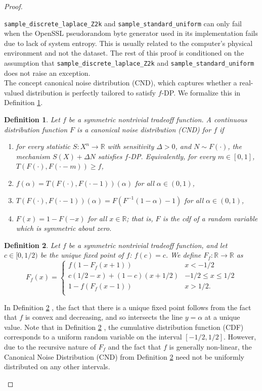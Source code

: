 \documentclass{article}
\newtheorem{defn}{Definition}
\begin{document}
\begin{proof}
\begin{enumerate}
    \texttt{sample\_discrete\_laplace\_Z2k} and \texttt{sample\_standard\_uniform} can only fail when the OpenSSL pseudorandom byte generator used in its implementation fails due to lack of system entropy. 
    This is usually related to the computer's physical environment and not the dataset. 
    The rest of this proof is conditioned on the assumption that \texttt{sample\_discrete\_laplace\_Z2k} and \texttt{sample\_standard\_uniform} does not raise an exception. \\
    The concept canonical noise distribution (CND)\parencite{awan2023canonical}, which captures whether a real-valued distribution is perfectly tailored to satisfy $f$-DP\parencite{dong2019gaussian}. We formalize this in Definition \ref{def2}\parencite{awan2023canonical}. 
    \begin{defn}\label{def2}  %
    Let $f$ be a symmetric nontrivial tradeoff function. A {continuous} distribution function $F$ is a \emph{canonical noise distribution} (CND) for $f$ if 
    \begin{enumerate}[(1)]
    \item for every statistic $S: X^n\rightarrow \mathbb{R}$ with sensitivity $\Delta>0$, and $N\sim F(\cdot)$, the mechanism $S(X) + \Delta N$ satisfies $f$-DP. Equivalently, for every $m\in [0,1]$, $T(F(\cdot),F(\cdot-m))\geq f$,
    \item $f(\alpha)=T(F(\cdot),F(\cdot-1))(\alpha)$ for all $\alpha \in (0,1)$,
    \item $T(F(\cdot),F(\cdot-1))(\alpha) = F(F^{-1}(1-\alpha)-1)$ for all $\alpha \in (0,1)$,
    \item $F(x) = 1-F(-x)$ for all $x\in \mathbb{R}$; that is, $F$ is the cdf of a random variable which is symmetric about zero.
    \end{enumerate}
    \end{defn}
    \begin{defn} \label{def1}  %
    Let $f$ be a symmetric nontrivial tradeoff function, and let {$c\in [0,1/2)$} be the unique fixed point of $f$: $f(c)=c$. We define $F_f:\mathbb{R}\rightarrow \mathbb{R}$ as  \[ F_f(x) = \begin{cases}
    f(1-F_f(x+1))&x<-1/2\\
    c(1/2-x) + (1-c)(x+1/2)&-1/2\leq x\leq 1/2\\
    1-f(F_f(x-1))&x>1/2.\\
    \end{cases}\]
    \end{defn}
    In Definition \ref{def1} \parencite{awan2023canonical}, the fact that there is a unique fixed point follows from the fact that $f$ is convex and decreasing, and so intersects the line $y=\alpha$ at a unique value. Note that in Definition \ref{def1} \parencite{awan2023canonical}, the cumulative distribution function (CDF) corresponds to a uniform random variable on the interval $[-1/2,1/2]$. However, due to the recursive nature of $F_f$ and the fact that $f$ is generally non-linear, the Canonical Noise Distribution (CND) from Definition \ref{def1} \parencite{awan2023canonical} need not be uniformly distributed on any other intervals.


\end{enumerate}
\end{proof}
\end{document}
